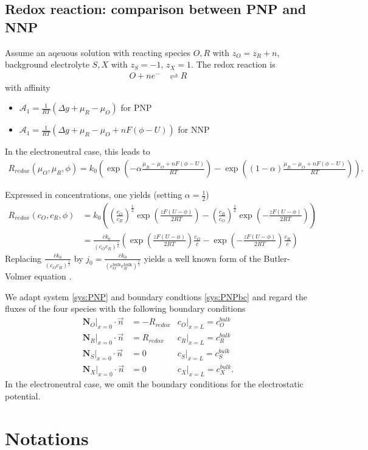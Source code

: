 \documentclass[12pt,oneside,reqno]{amsart}
\numberwithin{equation}{section}
\begin{document}
\subsection{Redox reaction: comparison between PNP and NNP}
Assume an aqeuous solution with reacting species
$O, R$  with $z_O= z_R+n$,  background electrolyte  $S, X$ with   $z_S=-1$, $z_X=1$.
The redox reaction is
\begin{align}\label{eq:redox}
     O + ne^- &\rightleftharpoons R
\end{align}
with affinity
\begin{itemize}
\item $\mathcal A_1= \frac{1}{RT}\left(\Delta g+ \mu_R - \mu_O\right)$ for PNP
\item $\mathcal A_1= \frac{1}{RT}\left(\Delta g+ \mu_R - \mu_O+ nF(\phi -U)\right)$ for NNP
\end{itemize}

In the electroneutral case, this leads to 
\begin{align}\label{eq:MBVneux}
  R_{redox}(\mu_O,\mu_R,\phi)= k_0\left(\exp\left(-\alpha\frac{\mu_R-\mu_O+nF(\phi-U)}{RT}\right)-\exp\left((1-\alpha)\frac{\mu_R-\mu_O+nF(\phi-U)}{RT}\right)\right).
\end{align}

Expressed in concentrations, one yields (setting $\alpha=\frac12$)
\begin{align}
  R_{redox}(c_O,c_R,\phi)&= k_0\left( \left(\frac{c_O}{c_R}\right)^{\frac12}\exp\left(\frac{zF(U-\phi)}{2RT}\right) - \left(\frac{c_R}{c_O}\right)^{\frac12}\exp\left(-\frac{zF(U-\phi)}{2RT}\right)\right)\\
                 &= \frac{\bar ck_0}{(c_Oc_R)^{\frac12}}\left(\exp\left(\frac{zF(U-\phi)}{2RT}\right)\frac{c_O}{\bar c} - \exp\left(-\frac{zF(U-\phi)}{2RT}\right)\frac{c_R}{\bar c}\right)
\label{eq:MBVohm}
\end{align}
Replacing $\frac{\bar ck_0}{(c_Oc_R)^{\frac12}}$ by $j_0=\frac{\bar ck_0}{(c_O^\text{bulk}c_R^\text{bulk})^{\frac12}}$
yields a well known form of the Butler-Volmer equation \cite{BardFaulkner}.

We adapt system \eqref{sys:PNP} and boundary condtions \eqref{sys:PNPbc} and regard the fluxes of the four species
with the following boundary conditions
\begin{align*}
  \mathbf N_O|_{x=0} \cdot \vec n &= -R_{redox} & c_O|_{x=L}= c_O^{bulk}\\
  \mathbf N_R|_{x=0} \cdot \vec n &= R_{redox}  & c_R|_{x=L}= c_R^{bulk}\\
  \mathbf N_S|_{x=0} \cdot \vec n &= 0  & c_S|_{x=L}= c_S^{bulk}\\
  \mathbf N_X|_{x=0} \cdot \vec n &= 0  & c_X|_{x=L}= c_X^{bulk}.
\end{align*}
In the electroneutral case, we omit the boundary conditions for the electrostatic potential.


\clearpage




\appendix
\section{Notations}
\end{document}
